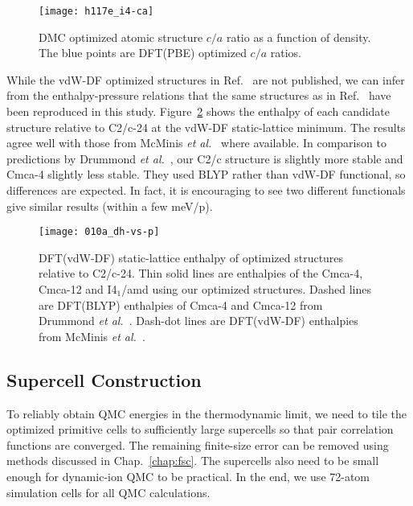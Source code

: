 \begin{figure}[h]
\centering
\begin{minipage}{0.49\textwidth}
\centering
\texttt{[image: h117e\_i4-ca]}
\end{minipage}
\caption{DMC optimized atomic structure $c/a$ ratio as a function of density. The blue points are DFT(PBE) optimized $c/a$ ratios.}
\label{fig:hsolid-i4-ca}
\end{figure}

While the vdW-DF optimized structures in Ref.~\cite{McMinis2015} are not published, we can infer from the enthalpy-pressure relations that the same structures as in Ref.~\cite{McMinis2015} have been reproduced in this study. Figure~\ref{fig:dft-opt-geo} shows the enthalpy of each candidate structure relative to C2/c-24 at the vdW-DF static-lattice minimum. The results agree well with those from McMinis \textit{et al.}~\cite{McMinis2015} where available.
In comparison to predictions by Drummond \textit{et al.}~\cite{Drummond2015}, our C2/c structure is slightly more stable and Cmca-4 slightly less stable.
They used BLYP rather than vdW-DF functional, so differences are expected. In fact, it is encouraging to see two different functionals give similar results (within a few meV/p).

\begin{figure}[h]
\centering
\texttt{[image: 010a\_dh-vs-p]}
\caption{DFT(vdW-DF) static-lattice enthalpy of optimized structures relative to C2/c-24. Thin solid lines are enthalpies of the Cmca-4, Cmca-12 and I4$_1$/amd using our optimized structures. Dashed lines are DFT(BLYP) enthalpies of Cmca-4 and Cmca-12 from Drummond \textit{et al.}~\cite{Drummond2015}. Dash-dot lines are DFT(vdW-DF) enthalpies from McMinis \textit{et al.}~\cite{McMinis2015}.}
\label{fig:dft-opt-geo}
\end{figure}

\subsection{Supercell Construction}
To reliably obtain QMC energies in the thermodynamic limit, we need to tile the optimized primitive cells to sufficiently large supercells so that pair correlation functions are converged.
The remaining finite-size error can be removed using methods discussed in Chap.~\ref{chap:fsc}.
The supercells also need to be small enough for dynamic-ion QMC to be practical.
In the end, we use 72-atom simulation cells for all QMC calculations.

